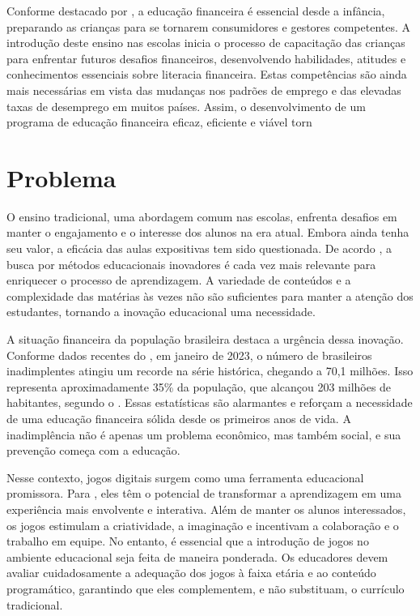 Conforme destacado por \cite{masnan2016financial}, a educação financeira é essencial desde a infância, preparando as crianças para se tornarem consumidores e gestores competentes. A introdução deste ensino nas escolas inicia o processo de capacitação das crianças para enfrentar futuros desafios financeiros, desenvolvendo habilidades, atitudes e conhecimentos essenciais sobre literacia financeira. Estas competências são ainda mais necessárias em vista das mudanças nos padrões de emprego e das elevadas taxas de desemprego em muitos países. Assim, o desenvolvimento de um programa de educação financeira eficaz, eficiente e viável torn


\section{Problema}

O ensino tradicional, uma abordagem comum nas escolas, enfrenta desafios em manter o engajamento e o interesse dos alunos na era atual. Embora ainda tenha seu valor, a eficácia das aulas expositivas tem sido questionada. De acordo \cite{fortes2023aprendizagem}, a busca por métodos educacionais inovadores é cada vez mais relevante para enriquecer o processo de aprendizagem. A variedade de conteúdos e a complexidade das matérias às vezes não são suficientes para manter a atenção dos estudantes, tornando a inovação educacional uma necessidade.

A situação financeira da população brasileira destaca a urgência dessa inovação. Conforme dados recentes do \cite{SERASA_2023}, em janeiro de 2023, o número de brasileiros inadimplentes atingiu um recorde na série histórica, chegando a 70,1 milhões. Isso representa aproximadamente 35\% da população, que alcançou 203 milhões de habitantes, segundo o \cite{IBGE_Censo_2022}. Essas estatísticas são alarmantes e reforçam a necessidade de uma educação financeira sólida desde os primeiros anos de vida. A inadimplência não é apenas um problema econômico, mas também social, e sua prevenção começa com a educação.

Nesse contexto, jogos digitais surgem como uma ferramenta educacional promissora. Para \cite{Cruz_Araujo_Andrye_Galvao_Madeira_2022}, eles têm o potencial de transformar a aprendizagem em uma experiência mais envolvente e interativa. Além de manter os alunos interessados, os jogos estimulam a criatividade, a imaginação e incentivam a colaboração e o trabalho em equipe. No entanto, é essencial que a introdução de jogos no ambiente educacional seja feita de maneira ponderada. Os educadores devem avaliar cuidadosamente a adequação dos jogos à faixa etária e ao conteúdo programático, garantindo que eles complementem, e não substituam, o currículo tradicional.

